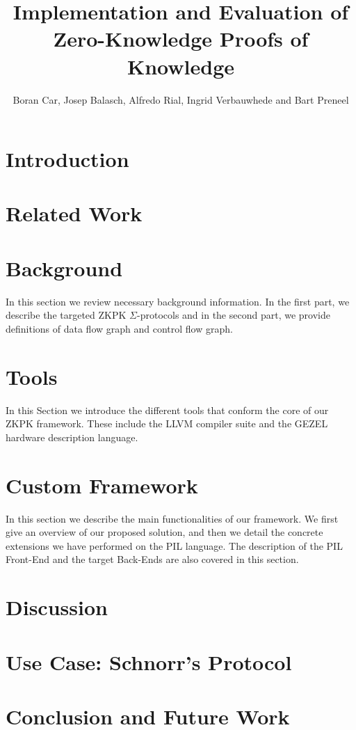 \documentclass[journal]{IEEEtran}
\begin{document}
\title{Implementation and Evaluation of Zero-Knowledge Proofs of Knowledge}

\author{
Boran Car, Josep Balasch, Alfredo Rial, Ingrid Verbauwhede and Bart Preneel}

\maketitle



\section{Introduction}
\label{introduction}


\section{Related Work}
\label{relatedwork}


\section{Background}
In this section we review necessary background information. In the
first part, we describe the targeted ZKPK $\Sigma$-protocols and in
the second part, we provide definitions of data flow graph and
control flow graph.
\label{preliminaries}


\section{Tools}
\label{sec:tools}
In this Section we introduce the different tools that conform the core
of our ZKPK framework. These include the LLVM compiler suite and the
GEZEL hardware description language.


\section{Custom Framework}
In this section we describe the main functionalities of our
framework. We first give an overview of our proposed solution, and
then we detail the concrete extensions we have performed on the PIL
language. The description of the PIL Front-End and the target
Back-Ends are also covered in this section.
\label{customframework}


\section{Discussion}
\label{discussion}


\section{Use Case: Schnorr's Protocol}
\label{schnorr}


\section{Conclusion and Future Work}
\label{conclusion}




\end{document}
